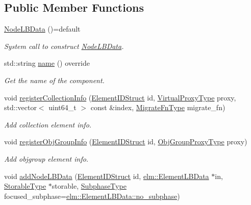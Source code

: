 \subsection*{Public Member Functions}
\begin{DoxyCompactItemize}
\item 
\hyperlink{structvt_1_1vrt_1_1collection_1_1balance_1_1_node_l_b_data_a058aa408a360bb30c48bd210dd0f1e25}{Node\+L\+B\+Data} ()=default
\begin{DoxyCompactList}\small\item\em System call to construct {\ttfamily \hyperlink{structvt_1_1vrt_1_1collection_1_1balance_1_1_node_l_b_data}{Node\+L\+B\+Data}}. \end{DoxyCompactList}\item 
std\+::string \hyperlink{structvt_1_1vrt_1_1collection_1_1balance_1_1_node_l_b_data_a004ae4be27dfb731b5ddae55dd589e56}{name} () override
\begin{DoxyCompactList}\small\item\em Get the name of the component. \end{DoxyCompactList}\item 
void \hyperlink{structvt_1_1vrt_1_1collection_1_1balance_1_1_node_l_b_data_a15795f61151de1c461c16308978d46a4}{register\+Collection\+Info} (\hyperlink{namespacevt_1_1vrt_1_1collection_1_1balance_a9f5b53fafb270212279a4757d2c4cd28}{Element\+I\+D\+Struct} id, \hyperlink{namespacevt_a1b417dd5d684f045bb58a0ede70045ac}{Virtual\+Proxy\+Type} proxy, std\+::vector$<$ uint64\+\_\+t $>$ const \&index, \hyperlink{structvt_1_1vrt_1_1collection_1_1balance_1_1_node_l_b_data_a200140e389d08dc8d74db16589e736bc}{Migrate\+Fn\+Type} migrate\+\_\+fn)
\begin{DoxyCompactList}\small\item\em Add collection element info. \end{DoxyCompactList}\item 
void \hyperlink{structvt_1_1vrt_1_1collection_1_1balance_1_1_node_l_b_data_af1c42abc6cf3be1878a39028aed9a659}{register\+Obj\+Group\+Info} (\hyperlink{namespacevt_1_1vrt_1_1collection_1_1balance_a9f5b53fafb270212279a4757d2c4cd28}{Element\+I\+D\+Struct} id, \hyperlink{namespacevt_ad7cae989df485fccca57f0792a880a8e}{Obj\+Group\+Proxy\+Type} proxy)
\begin{DoxyCompactList}\small\item\em Add objgroup element info. \end{DoxyCompactList}\item 
void \hyperlink{structvt_1_1vrt_1_1collection_1_1balance_1_1_node_l_b_data_a70b3e6ebe09346bf2986c10e2384e55b}{add\+Node\+L\+B\+Data} (\hyperlink{namespacevt_1_1vrt_1_1collection_1_1balance_a9f5b53fafb270212279a4757d2c4cd28}{Element\+I\+D\+Struct} id, \hyperlink{structvt_1_1elm_1_1_element_l_b_data}{elm\+::\+Element\+L\+B\+Data} $\ast$in, \hyperlink{structvt_1_1vrt_1_1collection_1_1balance_1_1_node_l_b_data_adf6ad57c147c8e9d6b47e07a437bb1a6}{Storable\+Type} $\ast$storable, \hyperlink{namespacevt_ae78cbfdf1e57470e33eedb074f2beeba}{Subphase\+Type} focused\+\_\+subphase=\hyperlink{structvt_1_1elm_1_1_element_l_b_data_af93ba399701c539f3acbe75095e0d080}{elm\+::\+Element\+L\+B\+Data\+::no\+\_\+subphase})

\end{DoxyCompactItemize}
